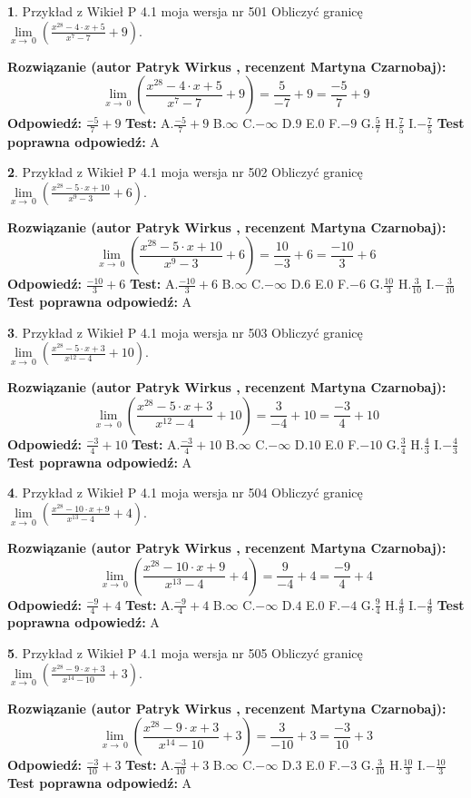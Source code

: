 \documentclass[12pt, a4paper]{article}
\theoremstyle{definition} %
\newtheorem{zad}{}
\newcommand{\zadStart}[1]{\begin{zad}#1\newline}
\newcommand{\zadStop}{\end{zad}}
\newcommand{\rozwStart}[2]{\noindent \textbf{Rozwiązanie (autor #1 , recenzent #2): }\newline}
\newcommand{\rozwStop}{\newline}
\newcommand{\odpStart}{\noindent \textbf{Odpowiedź:}\newline}
\newcommand{\odpStop}{\newline}
\newcommand{\testStart}{\noindent \textbf{Test:}\newline}
\newcommand{\testStop}{\newline}
\newcommand{\kluczStart}{\noindent \textbf{Test poprawna odpowiedź:}\newline}
\newcommand{\kluczStop}{\newline}
\begin{document}
\zadStart{Przykład z Wikieł P 4.1 moja wersja nr 501}
Obliczyć granicę $\lim\limits_{x\to\ 0}(\frac{x^{28}-4 \cdot x +5}{x^{7}-7}+9)$.
\zadStop
\rozwStart{Patryk Wirkus}{Martyna Czarnobaj}
$$\lim\limits_{x\to\ 0}(\frac{x^{28}-4 \cdot x +5}{x^{7}-7}+9)=\frac{5}{-7}+9=\frac{-5}{7}+9$$
\rozwStop
\odpStart
$\frac{-5}{7}+9$
\odpStop
\testStart
A.$\frac{-5}{7}+9$
B.$\infty$
C.$-\infty$
D.$9$
E.$0$
F.$-9$
G.$\frac{5}{7}$
H.$\frac{7}{5}$
I.$-\frac{7}{5}$
\testStop
\kluczStart
A
\kluczStop



\zadStart{Przykład z Wikieł P 4.1 moja wersja nr 502}
Obliczyć granicę $\lim\limits_{x\to\ 0}(\frac{x^{28}-5 \cdot x +10}{x^{9}-3}+6)$.
\zadStop
\rozwStart{Patryk Wirkus}{Martyna Czarnobaj}
$$\lim\limits_{x\to\ 0}(\frac{x^{28}-5 \cdot x +10}{x^{9}-3}+6)=\frac{10}{-3}+6=\frac{-10}{3}+6$$
\rozwStop
\odpStart
$\frac{-10}{3}+6$
\odpStop
\testStart
A.$\frac{-10}{3}+6$
B.$\infty$
C.$-\infty$
D.$6$
E.$0$
F.$-6$
G.$\frac{10}{3}$
H.$\frac{3}{10}$
I.$-\frac{3}{10}$
\testStop
\kluczStart
A
\kluczStop



\zadStart{Przykład z Wikieł P 4.1 moja wersja nr 503}
Obliczyć granicę $\lim\limits_{x\to\ 0}(\frac{x^{28}-5 \cdot x +3}{x^{12}-4}+10)$.
\zadStop
\rozwStart{Patryk Wirkus}{Martyna Czarnobaj}
$$\lim\limits_{x\to\ 0}(\frac{x^{28}-5 \cdot x +3}{x^{12}-4}+10)=\frac{3}{-4}+10=\frac{-3}{4}+10$$
\rozwStop
\odpStart
$\frac{-3}{4}+10$
\odpStop
\testStart
A.$\frac{-3}{4}+10$
B.$\infty$
C.$-\infty$
D.$10$
E.$0$
F.$-10$
G.$\frac{3}{4}$
H.$\frac{4}{3}$
I.$-\frac{4}{3}$
\testStop
\kluczStart
A
\kluczStop



\zadStart{Przykład z Wikieł P 4.1 moja wersja nr 504}
Obliczyć granicę $\lim\limits_{x\to\ 0}(\frac{x^{28}-10 \cdot x +9}{x^{13}-4}+4)$.
\zadStop
\rozwStart{Patryk Wirkus}{Martyna Czarnobaj}
$$\lim\limits_{x\to\ 0}(\frac{x^{28}-10 \cdot x +9}{x^{13}-4}+4)=\frac{9}{-4}+4=\frac{-9}{4}+4$$
\rozwStop
\odpStart
$\frac{-9}{4}+4$
\odpStop
\testStart
A.$\frac{-9}{4}+4$
B.$\infty$
C.$-\infty$
D.$4$
E.$0$
F.$-4$
G.$\frac{9}{4}$
H.$\frac{4}{9}$
I.$-\frac{4}{9}$
\testStop
\kluczStart
A
\kluczStop



\zadStart{Przykład z Wikieł P 4.1 moja wersja nr 505}
Obliczyć granicę $\lim\limits_{x\to\ 0}(\frac{x^{28}-9 \cdot x +3}{x^{14}-10}+3)$.
\zadStop
\rozwStart{Patryk Wirkus}{Martyna Czarnobaj}
$$\lim\limits_{x\to\ 0}(\frac{x^{28}-9 \cdot x +3}{x^{14}-10}+3)=\frac{3}{-10}+3=\frac{-3}{10}+3$$
\rozwStop
\odpStart
$\frac{-3}{10}+3$
\odpStop
\testStart
A.$\frac{-3}{10}+3$
B.$\infty$
C.$-\infty$
D.$3$
E.$0$
F.$-3$
G.$\frac{3}{10}$
H.$\frac{10}{3}$
I.$-\frac{10}{3}$
\testStop
\kluczStart
A
\kluczStop
\end{document}
